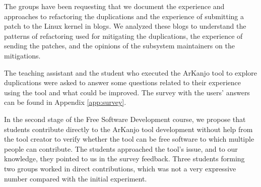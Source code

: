 The groups have been requesting that we document the experience and approaches to refactoring the 
duplications and the experience of submitting a patch to the Linux kernel in blogs. We analyzed 
these blogs to understand the patterns of refactoring used for mitigating the duplications, the 
experience of sending the patches, and the opinions of the subsystem maintainers on the mitigations.

The teaching assistant and the student who executed the ArKanjo tool to explore duplications were 
asked to answer some questions related to their experience using the tool and what could be improved. 
The survey with the users' answers can be found in Appendix \ref{app:survey}.

In the second stage of the Free Software Development course, we propose that students contribute 
directly to the ArKanjo tool development without help from the tool creator to verify whether the 
tool can be free software to which multiple people can contribute. The students approached the tool’s 
issue, and to our knowledge, they pointed to us in the survey feedback. Three students forming two 
groups worked in direct contributions, which was not a very expressive number compared with the 
initial experiment.

